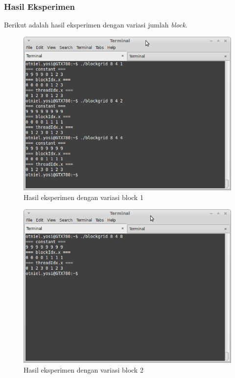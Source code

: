 \subsubsection{Hasil Eksperimen}

Berikut adalah hasil eksperimen dengan variasi jumlah \textit{block}.

\begin{figure}
	\centering
	\includegraphics[width=1\textwidth]
	{pics/block1}
	\caption{Hasil eksperimen dengan variasi block 1}
	\label{fig:block_demo1}
\end{figure}  

\begin{figure}
	\centering
	\includegraphics[width=1\textwidth]
	{pics/block2}
	\caption{Hasil eksperimen dengan variasi block 2}
	\label{fig:block_demo2}
\end{figure}

